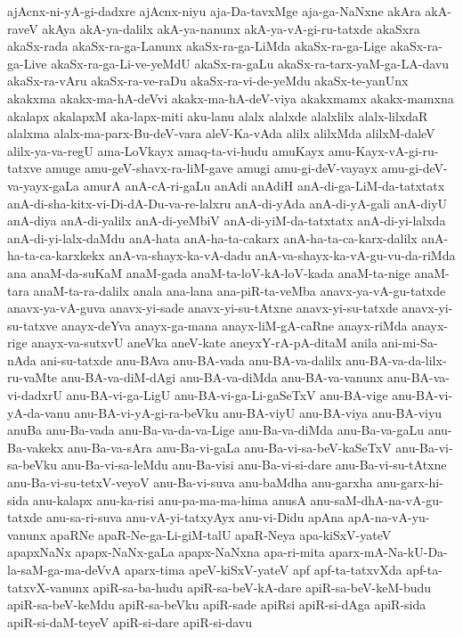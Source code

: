 {ajAcnx-ni-yA-gi-dadxre
ajAcnx-niyu
aja-Da-tavxMge
aja-ga-NaNxne
akAra
akA-raveV
akAya
akA-ya-dalilx
akA-ya-nanunx
akA-ya-vA-gi-ru-tatxde
akaSxra
akaSx-rada
akaSx-ra-ga-Lanunx
akaSx-ra-ga-LiMda
akaSx-ra-ga-Lige
akaSx-ra-ga-Live
akaSx-ra-ga-Li-ve-yeMdU
akaSx-ra-gaLu
akaSx-ra-tarx-yaM-ga-LA-davu
akaSx-ra-vAru
akaSx-ra-ve-raDu
akaSx-ra-vi-de-yeMdu
akaSx-te-yanUnx
akakxma
akakx-ma-hA-deVvi
akakx-ma-hA-deV-viya
akakxmamx
akakx-mamxna
akalapx
akalapxM
aka-lapx-miti
aku-lanu
alalx
alalxde
alalxlilx
alalx-lilxdaR
alalxma
alalx-ma-parx-Bu-deV-vara
aleV-Ka-vAda
alilx
alilxMda
alilxM-daleV
alilx-ya-va-regU
ama-LoVkayx
amaq-ta-vi-hudu
amuKayx
amu-Kayx-vA-gi-ru-tatxve
amuge
amu-geV-shavx-ra-liM-gave
amugi
amu-gi-deV-vayayx
amu-gi-deV-va-yayx-gaLa
amurA
anA-cA-ri-gaLu
anAdi
anAdiH
anA-di-ga-LiM-da-tatxtatx
anA-di-sha-kitx-vi-Di-dA-Du-va-re-lalxru
anA-di-yAda
anA-di-yA-gali
anA-diyU
anA-diya
anA-di-yalilx
anA-di-yeMbiV
anA-di-yiM-da-tatxtatx
anA-di-yi-lalxda
anA-di-yi-lalx-daMdu
anA-hata
anA-ha-ta-cakarx
anA-ha-ta-ca-karx-dalilx
anA-ha-ta-ca-karxkekx
anA-va-shayx-ka-vA-dadu
anA-va-shayx-ka-vA-gu-vu-da-riMda
ana
anaM-da-suKaM
anaM-gada
anaM-ta-loV-kA-loV-kada
anaM-ta-nige
anaM-tara
anaM-ta-ra-dalilx
anala
ana-lana
ana-piR-ta-veMba
anavx-ya-vA-gu-tatxde
anavx-ya-vA-guva
anavx-yi-sade
anavx-yi-su-tAtxne
anavx-yi-su-tatxde
anavx-yi-su-tatxve
anayx-deYva
anayx-ga-mana
anayx-liM-gA-caRne
anayx-riMda
anayx-rige
anayx-va-sutxvU
aneVka
aneV-kate
aneyxY-rA-pA-ditaM
anila
ani-mi-Sa-nAda
ani-su-tatxde
anu-BAva
anu-BA-vada
anu-BA-va-dalilx
anu-BA-va-da-lilx-ru-vaMte
anu-BA-va-diM-dAgi
anu-BA-va-diMda
anu-BA-va-vanunx
anu-BA-va-vi-dadxrU
anu-BA-vi-ga-LigU
anu-BA-vi-ga-Li-gaSeTxV
anu-BA-vige
anu-BA-vi-yA-da-vanu
anu-BA-vi-yA-gi-ra-beVku
anu-BA-viyU
anu-BA-viya
anu-BA-viyu
anuBa
anu-Ba-vada
anu-Ba-va-da-va-Lige
anu-Ba-va-diMda
anu-Ba-va-gaLu
anu-Ba-vakekx
anu-Ba-va-sAra
anu-Ba-vi-gaLa
anu-Ba-vi-sa-beV-kaSeTxV
anu-Ba-vi-sa-beVku
anu-Ba-vi-sa-leMdu
anu-Ba-visi
anu-Ba-vi-si-dare
anu-Ba-vi-su-tAtxne
anu-Ba-vi-su-tetxV-veyoV
anu-Ba-vi-suva
anu-baMdha
anu-garxha
anu-garx-hi-sida
anu-kalapx
anu-ka-risi
anu-pa-ma-ma-hima
anusA
anu-saM-dhA-na-vA-gu-tatxde
anu-sa-ri-suva
anu-vA-yi-tatxyAyx
anu-vi-Didu
apAna
apA-na-vA-yu-vanunx
apaRNe
apaR-Ne-ga-Li-giM-talU
apaR-Neya
apa-kiSxV-yateV
apapxNaNx
apapx-NaNx-gaLa
apapx-NaNxna
apa-ri-mita
aparx-mA-Na-kU-Da-la-saM-ga-ma-deVvA
aparx-tima
apeV-kiSxV-yateV
apf
apf-ta-tatxvXda
apf-ta-tatxvX-vanunx
apiR-sa-ba-hudu
apiR-sa-beV-kA-dare
apiR-sa-beV-keM-budu
apiR-sa-beV-keMdu
apiR-sa-beVku
apiR-sade
apiRsi
apiR-si-dAga
apiR-sida
apiR-si-daM-teyeV
apiR-si-dare
apiR-si-davu
}
